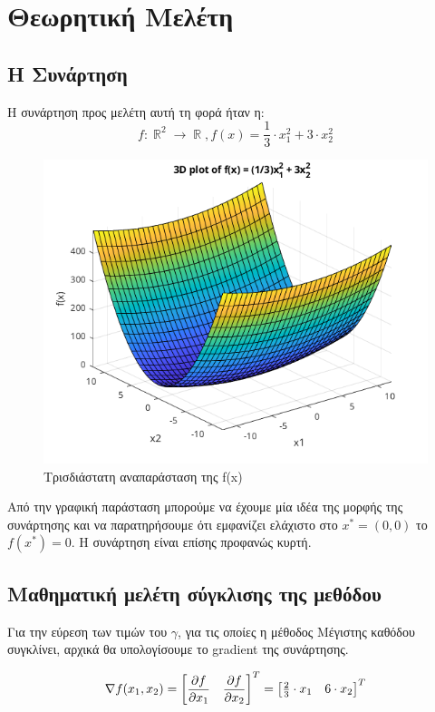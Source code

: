 \chapter{Θεωρητική Μελέτη}
\label{ch:theoretical}
\section{Η Συνάρτηση}
    Η συνάρτηση προς μελέτη αυτή τη φορά ήταν η:
    \begin{equation}
        f : \BbbR^2 \rightarrow \BbbR, f(x) = \frac13 \cdot x_1^2 + 3 \cdot x_2^2
    \end{equation}

    \begin{figure}[!h]
        \centering
        \includegraphics[width=0.8\linewidth]{Figs/f.png}
        \caption{Τρισδιάστατη αναπαράσταση της f(x)}
        \label{fig:f}
    \end{figure}

    Από την γραφική παράσταση μπορούμε να έχουμε μία ιδέα της μορφής της συνάρτησης και να παρατηρήσουμε ότι εμφανίζει ελάχιστο στο $x^* = (0,0)$ το $f(x^*) = 0$. Η συνάρτηση είναι επίσης προφανώς κυρτή.

\section{Μαθηματική μελέτη σύγκλισης της μεθόδου}
\label{sec:convergence}
    Για την εύρεση των τιμών του $\gamma$, για τις οποίες η μέθοδος Μέγιστης καθόδου συγκλίνει, αρχικά θα υπολογίσουμε το gradient της συνάρτησης.

    \begin{equation}
        \nabla f(x_1, x_2) = \begin{bmatrix} \displaystyle\frac{\partial f}{\partial x_1} & \displaystyle\frac{\partial f}{\partial x_2} \end{bmatrix}^T = \begin{bmatrix} \frac23 \cdot x_1& 6\cdot x_2 \end{bmatrix}^T
    \end{equation}

